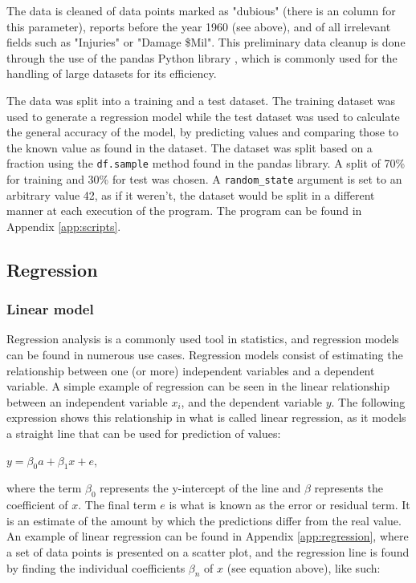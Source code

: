 \documentclass[11pt,letterpaper]{article}
\begin{document}
The data is cleaned of data points marked as "dubious" (there is an column for this parameter),
reports before the year 1960 (see above), and of all irrelevant fields such as "Injuries"
or "Damage \$Mil". This preliminary data cleanup
is done through the use of the pandas Python library \cite{reback2020pandas}\cite{mckinney-proc-scipy-2010},
which is commonly used for the handling of large datasets for its efficiency.

The data was split into a training and a test dataset. The training
dataset was used to generate a regression model while the test dataset was used
to calculate the general accuracy of the model, by predicting values and
comparing those to the known value as found in the dataset. The dataset was split based on
a fraction using the \verb|df.sample| method found in the pandas library. A split
of 70\% for training and 30\% for test was chosen. A \verb|random_state| argument is
set to an arbitrary value 42, as if it weren't, the dataset would be split in a different
manner at each execution of the program. The program can be found in Appendix \ref{app:scripts}.

\subsection{Regression}

\subsubsection{Linear model}

Regression analysis is a commonly used tool in statistics, and regression models can
be found in numerous use cases. Regression models consist of estimating the
relationship between one (or more) independent variables and a dependent variable. A
simple example of regression can be seen in the linear relationship between an independent
variable $x_{i}$, and the dependent variable $y$. The following expression shows this relationship in what is
called linear regression, as it models a straight line that can be used for prediction of
values:

$y =  \beta_0 a + \beta_1 x + e $,

where the term $\beta_0$ represents the y-intercept of the line and $\beta$ represents the
coefficient of $x$. The final term $e$ is what is known as the error or residual
term. It is an estimate of the amount by which the predictions differ from the real
value. An example of linear regression can be found in Appendix \ref{app:regression}, where
a set of data points is presented on a scatter plot, and the regression line is found
by finding the individual coefficients $\beta_n$ of $x$ (see equation above), like such:
\end{document}

